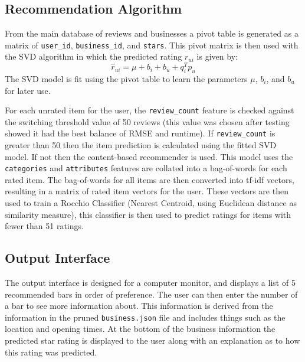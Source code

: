 \documentclass[conference]{IEEEtran}
\begin{document}
\subsection{Recommendation Algorithm}
From the main database of reviews and businesses a pivot table is generated as a matrix of \texttt{user\_id}, \texttt{business\_id}, and \texttt{stars}. This pivot matrix is then used with the SVD algorithm in which the predicted rating $\hat{r}_{ui}$ is given by:
\begin{equation}
    \hat{r}_{ui}=\mu+b_{i}+b_{u}+q_{i}^{T}p_{u}
\end{equation}
The SVD model is fit using the pivot table to learn the parameters $\mu$, $b_{i}$, and $b_{u}$ for later use.
\par
For each unrated item for the user, the \texttt{review\_count} feature is checked against the switching threshold value of 50 reviews (this value was chosen after testing showed it had the best balance of RMSE and runtime). If \texttt{review\_count} is greater than 50 then the item prediction is calculated using the fitted SVD model. If not then the content-based recommender is used. This model uses the \texttt{categories} and \texttt{attributes} features are collated into a bag-of-words for each rated item. The bag-of-words for all items are then converted into tf-idf vectors, resulting in a matrix of rated item vectors for the user. These vectors are then used to train a Rocchio Classifier (Nearest Centroid, using Euclidean distance as similarity measure), this classifier is then used to predict ratings for items with fewer than 51 ratings.
\subsection{Output Interface}
The output interface is designed for a computer monitor, and displays a list of 5 recommended bars in order of preference. The user can then enter the number of a bar to see more information about. This information is derived from the information in the pruned \texttt{business.json} file and includes things such as the location and opening times. At the bottom of the business information the predicted star rating is displayed to the user along with an explanation as to how this rating was predicted.
\end{document}
